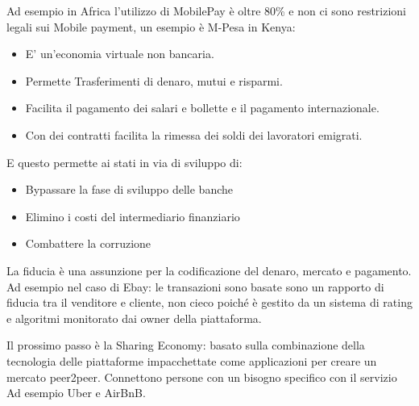 \documentclass[a4page, 11pt]{article}
\begin{document}
Ad esempio in Africa l’utilizzo di MobilePay è oltre 80\% e non ci sono restrizioni legali sui Mobile payment, un esempio è M-Pesa in Kenya:
\begin{itemize}
	\item E’ un’economia virtuale non bancaria.
	\item Permette Trasferimenti di denaro, mutui e risparmi.
	\item Facilita il pagamento dei salari e bollette e il pagamento internazionale.
	\item Con dei contratti facilita la rimessa dei soldi dei lavoratori emigrati.
\end{itemize}
E questo permette ai stati in via di sviluppo di:
\begin{itemize}
	\item Bypassare la fase di sviluppo delle banche
	\item Elimino i costi del intermediario finanziario
	\item Combattere la corruzione
\end{itemize}
La fiducia è una assunzione per la codificazione del denaro, mercato e pagamento. Ad esempio nel caso di Ebay: le transazioni sono basate sono un rapporto di fiducia tra il venditore e cliente, non cieco poiché è gestito da un sistema di rating e algoritmi monitorato dai owner della piattaforma. 

Il prossimo passo è la Sharing Economy: basato sulla combinazione della tecnologia delle piattaforme impacchettate come applicazioni per creare un mercato peer2peer. Connettono persone con un bisogno specifico con il servizio Ad esempio Uber e AirBnB. 
\end{document}
